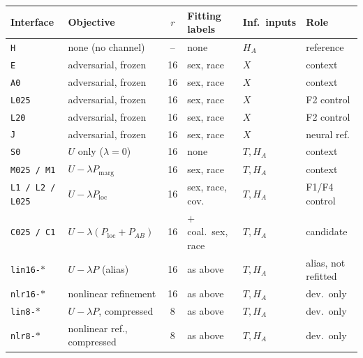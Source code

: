\begin{tabular}{@{}llclll@{}}
\toprule
Interface & Objective & $r$ & Fitting labels & Inf.\ inputs & Role \\
\midrule
\texttt{H} & none (no channel) & -- & none & $H_A$ & reference \\
\texttt{E} & adversarial, frozen & 16 & sex, race & $X$ & context \\
\texttt{A0} & adversarial, frozen & 16 & sex, race & $X$ & context \\
\texttt{L025} & adversarial, frozen & 16 & sex, race & $X$ & F2 control \\
\texttt{L20} & adversarial, frozen & 16 & sex, race & $X$ & F2 control \\
\texttt{J} & adversarial, frozen & 16 & sex, race & $X$ & neural ref. \\
\texttt{S0} & $U$ only ($\lambda=0$) & 16 & none & $T,H_A$ & context \\
\texttt{M025 / M1} & $U-\lambda P_{\mathrm{marg}}$ & 16 & sex, race & $T,H_A$ & context \\
\texttt{L1 / L2 / L025} & $U-\lambda P_{\mathrm{loc}}$ & 16 & sex, race, cov. & $T,H_A$ & F1/F4 control \\
\texttt{C025 / C1} & $U-\lambda(P_{\mathrm{loc}}{+}P_{AB})$ & 16 & $+$ coal.\ sex, race & $T,H_A$ & candidate \\
\texttt{lin16-$\ast$} & $U-\lambda P$ (alias) & 16 & as above & $T,H_A$ & alias, not refitted \\
\texttt{nlr16-$\ast$} & nonlinear refinement & 16 & as above & $T,H_A$ & dev.\ only \\
\texttt{lin8-$\ast$} & $U-\lambda P$, compressed & 8 & as above & $T,H_A$ & dev.\ only \\
\texttt{nlr8-$\ast$} & nonlinear ref., compressed & 8 & as above & $T,H_A$ & dev.\ only \\
\bottomrule
\end{tabular}
